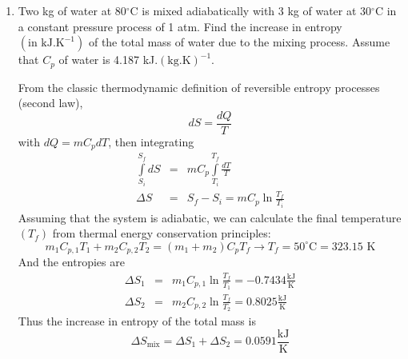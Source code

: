 \documentclass[12pts,a4paper,amsmath,amssymb,floatfix]{article}%
\newcommand{\frc}{\displaystyle\frac}
\begin{document}
\begin{enumerate}[1)]
\clearpage
   \item Two kg of water at 80$^{\circ}$C is mixed adiabatically with 3 kg of water at 30$^{\circ}$C in a constant pressure process of 1 atm. Find the increase in entropy $\left(\text{in kJ.K}^{-1}\right)$ of the total mass of water due to the mixing process. Assume that $C_{p}$ of water is 4.187 kJ.$\left(\text{kg.K}\right)^{-1}$. 

        From the classic thermodynamic definition of reversible entropy processes (second law),
         \begin{displaymath}
            d S = \frc{d Q}{T}
         \end{displaymath}
         with $dQ = m C_{p}dT$, then integrating 
         \begin{eqnarray}
            \int\limits_{S_{i}}^{S_{f}} dS &=& m C_{p}\int\limits_{T_{i}}^{T_{f}}\frc{dT}{T} \nonumber \\
            \Delta S &=& S_{f}-S_{i} = m C_{p} \ln{\frc{T_{f}}{T_{i}}} \nonumber
         \end{eqnarray}
         Assuming that the system is adiabatic, we can calculate the final temperature $\left(T_{f}\right)$ from thermal energy conservation principles: 
         \begin{displaymath}
            m_{1}C_{p,1}T_{1} + m_{2}C_{p,2}T_{2} = \left(m_{1}+m_{2}\right)C_{p}T_{f} \rightarrow T_{f} = 50^{\circ}\text{C} = 323.15\text{ K}
         \end{displaymath}
         And the entropies are
         \begin{eqnarray}
             \Delta S_{1} &=& m_{1}C_{p,1}\ln{\frc{T_{f}}{T_{1}}} =  -0.7434\frc{\text{kJ}}{\text{K}} \nonumber \\
             \Delta S_{2} &=& m_{2}C_{p,2}\ln{\frc{T_{f}}{T_{2}}} =  0.8025\frc{\text{kJ}}{\text{K}} \nonumber 
         \end{eqnarray}
         Thus the increase in entropy of the total mass is
         \begin{displaymath}
              \Delta S_{\text{mix}} = \Delta S_{1} + \Delta S_{2} = 0.0591\frc{\text{kJ}}{\text{K}}
         \end{displaymath}
%
\end{enumerate}

\clearpage
\end{document}
